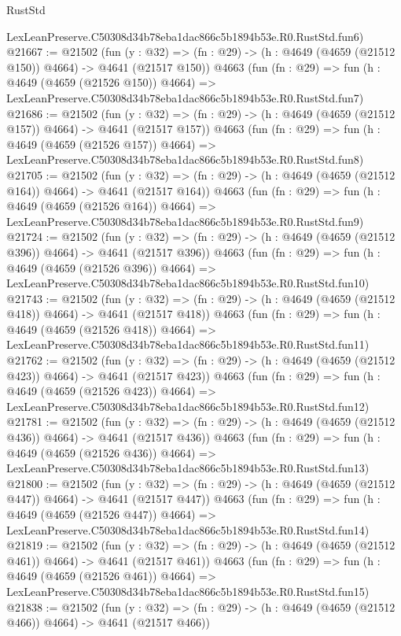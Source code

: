 \begin{lexlean}{RustStd}
\begin{coremodule}
    LexLeanPreserve.C50308d34b78eba1dac866c5b1894b53e.R0.RustStd.fun6)
@21667 := @21502
    (fun (y : @32) => (fn : @29) -> (h : @4649 (@4659 (@21512 @150)) @4664) -> @4641 (@21517 @150))
    @4663
    (fun (fn : @29) =>
    fun (h : @4649 (@4659 (@21526 @150)) @4664) =>
    LexLeanPreserve.C50308d34b78eba1dac866c5b1894b53e.R0.RustStd.fun7)
@21686 := @21502
    (fun (y : @32) => (fn : @29) -> (h : @4649 (@4659 (@21512 @157)) @4664) -> @4641 (@21517 @157))
    @4663
    (fun (fn : @29) =>
    fun (h : @4649 (@4659 (@21526 @157)) @4664) =>
    LexLeanPreserve.C50308d34b78eba1dac866c5b1894b53e.R0.RustStd.fun8)
@21705 := @21502
    (fun (y : @32) => (fn : @29) -> (h : @4649 (@4659 (@21512 @164)) @4664) -> @4641 (@21517 @164))
    @4663
    (fun (fn : @29) =>
    fun (h : @4649 (@4659 (@21526 @164)) @4664) =>
    LexLeanPreserve.C50308d34b78eba1dac866c5b1894b53e.R0.RustStd.fun9)
@21724 := @21502
    (fun (y : @32) => (fn : @29) -> (h : @4649 (@4659 (@21512 @396)) @4664) -> @4641 (@21517 @396))
    @4663
    (fun (fn : @29) =>
    fun (h : @4649 (@4659 (@21526 @396)) @4664) =>
    LexLeanPreserve.C50308d34b78eba1dac866c5b1894b53e.R0.RustStd.fun10)
@21743 := @21502
    (fun (y : @32) => (fn : @29) -> (h : @4649 (@4659 (@21512 @418)) @4664) -> @4641 (@21517 @418))
    @4663
    (fun (fn : @29) =>
    fun (h : @4649 (@4659 (@21526 @418)) @4664) =>
    LexLeanPreserve.C50308d34b78eba1dac866c5b1894b53e.R0.RustStd.fun11)
@21762 := @21502
    (fun (y : @32) => (fn : @29) -> (h : @4649 (@4659 (@21512 @423)) @4664) -> @4641 (@21517 @423))
    @4663
    (fun (fn : @29) =>
    fun (h : @4649 (@4659 (@21526 @423)) @4664) =>
    LexLeanPreserve.C50308d34b78eba1dac866c5b1894b53e.R0.RustStd.fun12)
@21781 := @21502
    (fun (y : @32) => (fn : @29) -> (h : @4649 (@4659 (@21512 @436)) @4664) -> @4641 (@21517 @436))
    @4663
    (fun (fn : @29) =>
    fun (h : @4649 (@4659 (@21526 @436)) @4664) =>
    LexLeanPreserve.C50308d34b78eba1dac866c5b1894b53e.R0.RustStd.fun13)
@21800 := @21502
    (fun (y : @32) => (fn : @29) -> (h : @4649 (@4659 (@21512 @447)) @4664) -> @4641 (@21517 @447))
    @4663
    (fun (fn : @29) =>
    fun (h : @4649 (@4659 (@21526 @447)) @4664) =>
    LexLeanPreserve.C50308d34b78eba1dac866c5b1894b53e.R0.RustStd.fun14)
@21819 := @21502
    (fun (y : @32) => (fn : @29) -> (h : @4649 (@4659 (@21512 @461)) @4664) -> @4641 (@21517 @461))
    @4663
    (fun (fn : @29) =>
    fun (h : @4649 (@4659 (@21526 @461)) @4664) =>
    LexLeanPreserve.C50308d34b78eba1dac866c5b1894b53e.R0.RustStd.fun15)
@21838 := @21502
    (fun (y : @32) => (fn : @29) -> (h : @4649 (@4659 (@21512 @466)) @4664) -> @4641 (@21517 @466))

\end{coremodule}
\end{lexlean}
